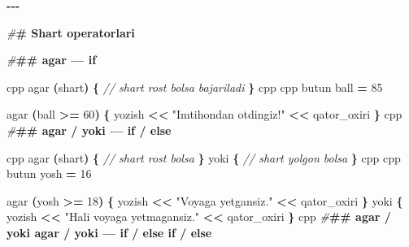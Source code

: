 \documentclass[a4paper,11pt,twoside,openright]{book}
\newenvironment{Shaded}{\begin{snugshade}}{\end{snugshade}}
\newcommand{\CommentTok}[1]{\textcolor[rgb]{0.56,0.35,0.01}{\textit{#1}}}
\newcommand{\DecValTok}[1]{\textcolor[rgb]{0.00,0.00,0.81}{#1}}
\newcommand{\ErrorTok}[1]{\textcolor[rgb]{0.64,0.00,0.00}{\textbf{#1}}}
\newcommand{\NormalTok}[1]{#1}
\newcommand{\OperatorTok}[1]{\textcolor[rgb]{0.81,0.36,0.00}{\textbf{#1}}}
\newcommand{\PreprocessorTok}[1]{\textcolor[rgb]{0.56,0.35,0.01}{\textit{#1}}}
\newcommand{\StringTok}[1]{\textcolor[rgb]{0.31,0.60,0.02}{#1}}
\begin{document}
\begin{Shaded}
\begin{Highlighting}[]
\OperatorTok{{-}{-}{-}}

\PreprocessorTok{\#}\ErrorTok{\# Shart operatorlari}

\PreprocessorTok{\#}\ErrorTok{\#\# \textasciigrave{}agar\textasciigrave{} — \textasciigrave{}if\textasciigrave{}}

\ErrorTok{\textasciigrave{}\textasciigrave{}\textasciigrave{}}\NormalTok{cpp}
\NormalTok{agar }\OperatorTok{(}\NormalTok{shart}\OperatorTok{)} \OperatorTok{\{}
    \CommentTok{// shart rost bo\textquotesingle{}lsa bajariladi}
\OperatorTok{\}}
\ErrorTok{\textasciigrave{}\textasciigrave{}\textasciigrave{}}\NormalTok{cpp}
\ErrorTok{\textasciigrave{}\textasciigrave{}\textasciigrave{}}\NormalTok{cpp}
\NormalTok{butun ball }\OperatorTok{=} \DecValTok{85}

\NormalTok{agar }\OperatorTok{(}\NormalTok{ball }\OperatorTok{\textgreater{}=} \DecValTok{60}\OperatorTok{)} \OperatorTok{\{}
\NormalTok{    yozish }\OperatorTok{\textless{}\textless{}} \StringTok{"Imtihondan o\textquotesingle{}tdingiz!"} \OperatorTok{\textless{}\textless{}}\NormalTok{ qator\_oxiri}
\OperatorTok{\}}
\ErrorTok{\textasciigrave{}\textasciigrave{}\textasciigrave{}}\NormalTok{cpp}
\PreprocessorTok{\#}\ErrorTok{\#\# \textasciigrave{}agar\textasciigrave{} / \textasciigrave{}yoki\textasciigrave{} — \textasciigrave{}if\textasciigrave{} / \textasciigrave{}else\textasciigrave{}}

\ErrorTok{\textasciigrave{}\textasciigrave{}\textasciigrave{}}\NormalTok{cpp}
\NormalTok{agar }\OperatorTok{(}\NormalTok{shart}\OperatorTok{)} \OperatorTok{\{}
    \CommentTok{// shart rost bo\textquotesingle{}lsa}
\OperatorTok{\}}\NormalTok{ yoki }\OperatorTok{\{}
    \CommentTok{// shart yolg\textquotesingle{}on bo\textquotesingle{}lsa}
\OperatorTok{\}}
\ErrorTok{\textasciigrave{}\textasciigrave{}\textasciigrave{}}\NormalTok{cpp}
\ErrorTok{\textasciigrave{}\textasciigrave{}\textasciigrave{}}\NormalTok{cpp}
\NormalTok{butun yosh }\OperatorTok{=} \DecValTok{16}

\NormalTok{agar }\OperatorTok{(}\NormalTok{yosh }\OperatorTok{\textgreater{}=} \DecValTok{18}\OperatorTok{)} \OperatorTok{\{}
\NormalTok{    yozish }\OperatorTok{\textless{}\textless{}} \StringTok{"Voyaga yetgansiz."} \OperatorTok{\textless{}\textless{}}\NormalTok{ qator\_oxiri}
\OperatorTok{\}}\NormalTok{ yoki }\OperatorTok{\{}
\NormalTok{    yozish }\OperatorTok{\textless{}\textless{}} \StringTok{"Hali voyaga yetmagansiz."} \OperatorTok{\textless{}\textless{}}\NormalTok{ qator\_oxiri}
\OperatorTok{\}}
\ErrorTok{\textasciigrave{}\textasciigrave{}\textasciigrave{}}\NormalTok{cpp}
\PreprocessorTok{\#}\ErrorTok{\#\# \textasciigrave{}agar\textasciigrave{} / \textasciigrave{}yoki agar\textasciigrave{} / \textasciigrave{}yoki\textasciigrave{} — \textasciigrave{}if\textasciigrave{} / \textasciigrave{}else if\textasciigrave{} / \textasciigrave{}else\textasciigrave{}}


\end{Highlighting}
\end{Shaded}
\end{document}

